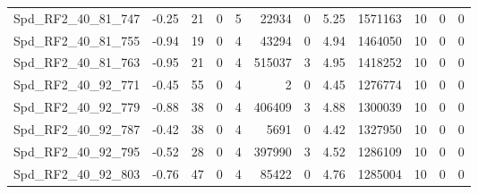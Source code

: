 \begin{longtable}[c]{@{}lrrrrrrrrrrr@{}}
Spd\_RF2\_40\_81\_747         & -0.25                  & 21                      & 0                       & 5                      & 22934                   & 0                       & 5.25                    & 1571163                  & 10                       & 0                        & 0                        \\
Spd\_RF2\_40\_81\_755         & -0.94                  & 19                      & 0                       & 4                      & 43294                   & 0                       & 4.94                    & 1464050                  & 10                       & 0                        & 0                        \\
Spd\_RF2\_40\_81\_763         & -0.95                  & 21                      & 0                       & 4                      & 515037                  & 3                       & 4.95                    & 1418252                  & 10                       & 0                        & 0                        \\
Spd\_RF2\_40\_92\_771         & -0.45                  & 55                      & 0                       & 4                      & 2                       & 0                       & 4.45                    & 1276774                  & 10                       & 0                        & 0                        \\
Spd\_RF2\_40\_92\_779         & -0.88                  & 38                      & 0                       & 4                      & 406409                  & 3                       & 4.88                    & 1300039                  & 10                       & 0                        & 0                        \\
Spd\_RF2\_40\_92\_787         & -0.42                  & 38                      & 0                       & 4                      & 5691                    & 0                       & 4.42                    & 1327950                  & 10                       & 0                        & 0                        \\
Spd\_RF2\_40\_92\_795         & -0.52                  & 28                      & 0                       & 4                      & 397990                  & 3                       & 4.52                    & 1286109                  & 10                       & 0                        & 0                        \\
Spd\_RF2\_40\_92\_803         & -0.76                  & 47                      & 0                       & 4                      & 85422                   & 0                       & 4.76                    & 1285004                  & 10                       & 0                        & 0                        \\

\end{longtable}
